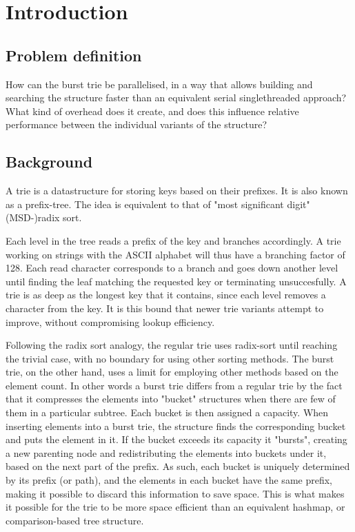 \chapter{Introduction}

\section{Problem definition}
How can the burst trie be parallelised, in a way that allows building and searching
the structure faster than an equivalent serial singlethreaded approach?
What kind of overhead does it create, and does this influence relative
performance between the individual variants of the structure?


\section{Background}
A trie is a datastructure for storing keys based on their prefixes.
It is also known as a prefix-tree. The idea is equivalent to that of
"most significant digit" (MSD-)radix sort.

Each level in the tree reads a prefix of the key and branches accordingly.
A trie working on strings with the ASCII alphabet will thus have a branching
factor of 128. Each read character corresponds to a branch and goes down another
level until finding the leaf matching the requested key or terminating
unsuccesfully. A trie is as deep as the longest key that it contains, since
each level removes a character from the key. It is this bound that newer trie
variants attempt to improve, without compromising lookup efficiency.

Following the radix sort analogy, the regular trie uses radix-sort until
reaching the trivial case, with no boundary for using other sorting methods.
The burst trie, on the other hand, uses a limit for employing other methods
based on the element count. In other words a burst trie differs from a regular
trie by the fact that it compresses the elements into "bucket" structures when
there are few of them in a particular subtree. Each bucket is then assigned a
capacity. When inserting elements into a burst trie, the structure finds the
corresponding bucket and puts the element in it. If the bucket exceeds its
capacity it "bursts", creating a new parenting node and redistributing the
elements into buckets under it, based on the next part of the prefix. As such,
each bucket is uniquely determined by its prefix (or path), and the elements in
each bucket have the same prefix, making it possible to discard this
information to save space. This is what makes it possible for the trie to be
more space efficient than an equivalent hashmap, or comparison-based tree
structure.

